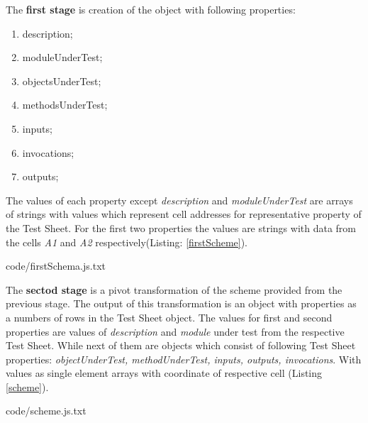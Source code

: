 The \textbf{first stage} is creation of the object with following properties:
\begin{enumerate}
	\item description;
	\item moduleUnderTest;
	\item objectsUnderTest;
	\item methodsUnderTest;
	\item inputs;
	\item invocations;
	\item outputs;
\end{enumerate}

 The values of each property except \textit{description} and \textit{moduleUnderTest} are arrays of strings with values which represent cell addresses for representative property of the Test Sheet. For the first two properties the values are strings with data  from the cells \textit{A1} and \textit{A2} respectively(Listing: \ref{firstScheme}).


{code/firstSchema.js.txt}

The \textbf{sectod stage} is a pivot transformation of the scheme provided from the previous stage. The output of this transformation is an object with properties as a numbers of rows in the Test Sheet object. The values for first and second properties are values of \textit{description} and \textit{module} under test from the respective Test Sheet. While next of them are objects which consist of following Test Sheet properties: \textit{objectUnderTest, methodUnderTest, inputs, outputs, invocations}. With values as single element arrays with coordinate of respective cell (Listing \ref{scheme}).

{code/scheme.js.txt}

%

